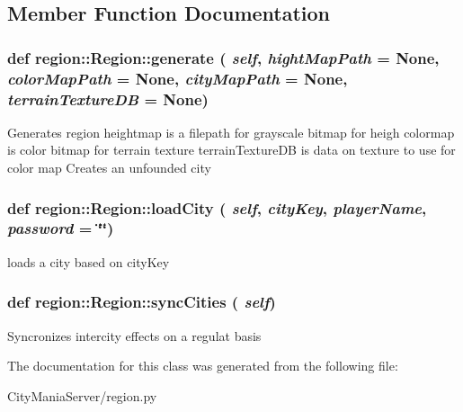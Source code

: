 \subsection{Member Function Documentation}
\hypertarget{classregion_1_1Region_a526194edb7c6a6cb23d3f36a89093cf8}{
\subsubsection[{generate}]{\setlength{\rightskip}{0pt plus 5cm}def region::Region::generate ( {\em self}, \/   {\em hightMapPath} = {\ttfamily None}, \/   {\em colorMapPath} = {\ttfamily None}, \/   {\em cityMapPath} = {\ttfamily None}, \/   {\em terrainTextureDB} = {\ttfamily None})}}
\label{classregion_1_1Region_a526194edb7c6a6cb23d3f36a89093cf8}
\begin{DoxyVerb}
Generates region
heightmap is a filepath for grayscale bitmap for heigh
colormap is color bitmap for terrain texture
terrainTextureDB is data on texture to use for color map
Creates an unfounded city
\end{DoxyVerb}
 \hypertarget{classregion_1_1Region_a496244739549595cb98062d08d774ec1}{
\subsubsection[{loadCity}]{\setlength{\rightskip}{0pt plus 5cm}def region::Region::loadCity ( {\em self}, \/   {\em cityKey}, \/   {\em playerName}, \/   {\em password} = {\ttfamily \char`\"{}\char`\"{}})}}
\label{classregion_1_1Region_a496244739549595cb98062d08d774ec1}
\begin{DoxyVerb}
loads a city based on cityKey
\end{DoxyVerb}
 \hypertarget{classregion_1_1Region_a7b8b846713ca3d88d57d9939aafe7ab4}{
\subsubsection[{syncCities}]{\setlength{\rightskip}{0pt plus 5cm}def region::Region::syncCities ( {\em self})}}
\label{classregion_1_1Region_a7b8b846713ca3d88d57d9939aafe7ab4}
\begin{DoxyVerb}
Syncronizes intercity effects on a regulat basis
\end{DoxyVerb}
 

The documentation for this class was generated from the following file:\begin{DoxyCompactItemize}
\item 
CityManiaServer/region.py\end{DoxyCompactItemize}
